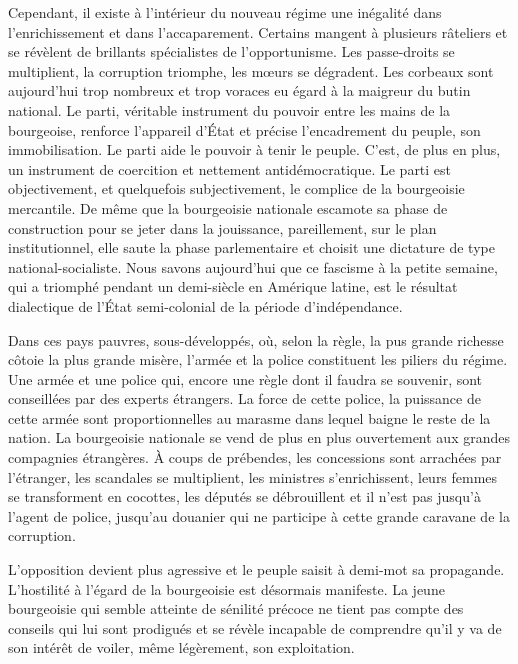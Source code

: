 \documentclass[french,twoside]{book} %
\begin{document}
\noindent Cependant, il existe à l’intérieur du nouveau régime une inégalité dans l’enrichissement et dans l’accaparement. Certains mangent à plusieurs râteliers et se révèlent de brillants spécialistes de l’opportunisme. Les passe-droits se multiplient, la corruption triomphe, les mœurs se dégradent. Les corbeaux sont aujourd’hui trop nombreux et trop voraces eu égard à la maigreur du butin national. Le parti, véritable instrument du pouvoir entre les mains de la bourgeoise, renforce l’appareil d’État et précise l’encadrement du peuple, son immobilisation. Le parti aide le pouvoir à tenir le peuple. C’est, de plus en plus, un instrument de coercition et nettement antidémocratique. Le parti est objectivement, et quelquefois subjectivement, le complice de la bourgeoisie mercantile. De même que la bourgeoisie nationale escamote sa phase de construction pour se jeter dans la jouissance, pareillement, sur le plan institutionnel, elle saute la phase parlementaire et choisit une dictature de type national-socialiste. Nous savons aujourd’hui que ce fascisme à la petite semaine, qui a triomphé pendant un demi-siècle en Amérique latine, est le résultat dialectique de l’État semi-colonial de la période d’indépendance.\par
\bigbreak
\noindent Dans ces pays pauvres, sous-développés, où, selon la règle, la pus grande richesse côtoie la plus grande misère, l’armée et la police constituent les piliers du régime. Une armée et une police qui, encore une règle dont il faudra se souvenir, sont conseillées par des experts étrangers. La force de cette police, la puissance de cette armée sont proportionnelles au marasme dans lequel baigne le reste de la nation. La bourgeoisie nationale se vend de plus en plus ouvertement aux grandes compagnies étrangères. À coups de prébendes, les concessions sont arrachées par l’étranger, les scandales se multiplient, les ministres   s’enrichissent, leurs femmes se transforment en cocottes, les députés se débrouillent et il n’est pas jusqu’à l’agent de police, jusqu’au douanier qui ne participe à cette grande caravane de la corruption.\par
L’opposition devient plus agressive et le peuple saisit à demi-mot sa propagande. L’hostilité à l’égard de la bourgeoisie est désormais manifeste. La jeune bourgeoisie qui semble atteinte de sénilité précoce ne tient pas compte des conseils qui lui sont prodigués et se révèle incapable de comprendre qu’il y va de son intérêt de voiler, même légèrement, son exploitation.\par
\end{document}
